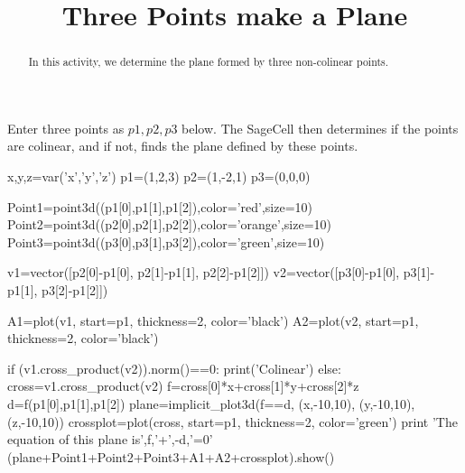 \documentclass{ximera}
\title{Three Points make a Plane}
\begin{document}
      
\begin{abstract}
      
In this activity, we determine the plane formed by three non-colinear points.
      
\end{abstract}
      
\maketitle
      

Enter  three points as $p1, p2, p3$ below.  The SageCell then determines if the points are colinear, and if not, finds the plane defined by these points.


\begin{sageCell}
x,y,z=var('x','y','z')
p1=(1,2,3)
p2=(1,-2,1)
p3=(0,0,0)

Point1=point3d((p1[0],p1[1],p1[2]),color='red',size=10)
Point2=point3d((p2[0],p2[1],p2[2]),color='orange',size=10)
Point3=point3d((p3[0],p3[1],p3[2]),color='green',size=10)

v1=vector([p2[0]-p1[0], p2[1]-p1[1], p2[2]-p1[2]])
v2=vector([p3[0]-p1[0], p3[1]-p1[1], p3[2]-p1[2]])

A1=plot(v1, start=p1, thickness=2, color='black')
A2=plot(v2, start=p1, thickness=2, color='black')

if (v1.cross_product(v2)).norm()==0:
    print('Colinear')
else:
    cross=v1.cross_product(v2)
    f=cross[0]*x+cross[1]*y+cross[2]*z
    d=f(p1[0],p1[1],p1[2])
    plane=implicit_plot3d(f==d, (x,-10,10), (y,-10,10),(z,-10,10))
    crossplot=plot(cross, start=p1, thickness=2, color='green')
    print 'The equation of this plane is',f,'+',-d,'=0'
    (plane+Point1+Point2+Point3+A1+A2+crossplot).show()
\end{sageCell}






 
 
 
 
      
\end{document}
